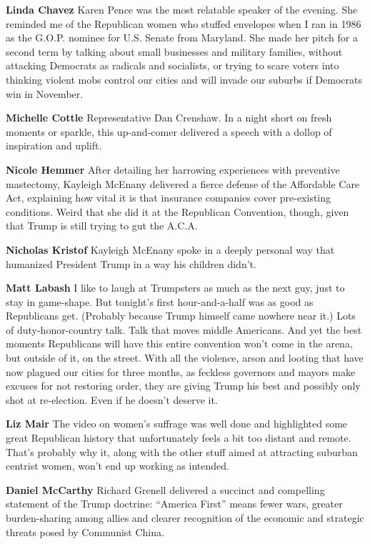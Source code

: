 \textbf{Linda Chavez} Karen Pence was the most relatable speaker of the
evening. She reminded me of the Republican women who stuffed envelopes
when I ran in 1986 as the G.O.P. nominee for U.S. Senate from Maryland.
She made her pitch for a second term by talking about small businesses
and military families, without attacking Democrats as radicals and
socialists, or trying to scare voters into thinking violent mobs control
our cities and will invade our suburbs if Democrats win in November.

\textbf{Michelle Cottle} Representative Dan Crenshaw. In a night short
on fresh moments or sparkle, this up-and-comer delivered a speech with a
dollop of inspiration and uplift.

\textbf{Nicole Hemmer} After detailing her harrowing experiences with
preventive mastectomy, Kayleigh McEnany delivered a fierce defense of
the Affordable Care Act, explaining how vital it is that insurance
companies cover pre-existing conditions. Weird that she did it at the
Republican Convention, though, given that Trump is still trying to gut
the A.C.A.

\textbf{Nicholas Kristof} Kayleigh McEnany spoke in a deeply personal
way that humanized President Trump in a way his children didn't.

\textbf{Matt Labash} I like to laugh at Trumpsters as much as the next
guy, just to stay in game-shape. But tonight's first hour-and-a-half was
as good as Republicans get. (Probably because Trump himself came nowhere
near it.) Lots of duty-honor-country talk. Talk that moves middle
Americans. And yet the best moments Republicans will have this entire
convention won't come in the arena, but outside of it, on the street.
With all the violence, arson and looting that have now plagued our
cities for three months, as feckless governors and mayors make excuses
for not restoring order, they are giving Trump his best and possibly
only shot at re-election. Even if he doesn't deserve it.

\textbf{Liz Mair} The video on women's suffrage was well done and
highlighted some great Republican history that unfortunately feels a bit
too distant and remote. That's probably why it, along with the other
stuff aimed at attracting suburban centrist women, won't end up working
as intended.

\textbf{Daniel McCarthy} Richard Grenell delivered a succinct and
compelling statement of the Trump doctrine: ``America First'' means
fewer wars, greater burden-sharing among allies and clearer recognition
of the economic and strategic threats posed by Communist China.

